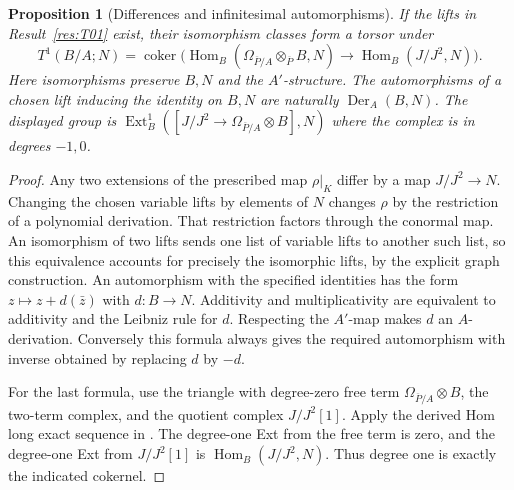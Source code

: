 \documentclass[11pt,oneside,openany]{book}
\newtheorem{proposition}[theorem]{Proposition}
\theoremstyle{definition}
\theoremstyle{remark}
\begin{document}
\begin{proposition}[Differences and infinitesimal automorphisms]\label{res:T02}
If the lifts in Result~\ref{res:T01} exist, their isomorphism
classes form a torsor under
\[
 T^1(B/A;N)=
 \operatorname{coker}\bigl(
  \operatorname{Hom}_B(\Omega_{\overline P/A}\otimes_{\overline P}B,N)
  \longrightarrow \operatorname{Hom}_B(J/J^2,N)\bigr).
\]
Here isomorphisms preserve \(B,N\) and the \(A'\)-structure.
The automorphisms of a chosen lift inducing the identity on
\(B,N\) are naturally \(\operatorname{Der}_A(B,N)\).
The displayed group is
\(\operatorname{Ext}^1_B([J/J^2\to\Omega_{\overline P/A}\otimes B],N)\)
where the complex is in degrees \(-1,0\).
\end{proposition}
\begin{proof}
Any two extensions of the prescribed map \(\rho|_K\) differ by a
map \(J/J^2\to N\). Changing the chosen variable lifts by elements
of \(N\) changes \(\rho\) by the restriction of a polynomial
derivation. That restriction factors through the conormal map.
An isomorphism of two lifts sends one list of variable lifts to
another such list, so this equivalence accounts for precisely the
isomorphic lifts, by the explicit graph construction.
An automorphism with the specified identities has the form
\(z\mapsto z+d(\bar z)\) with \(d:B\to N\). Additivity and
multiplicativity are equivalent to additivity and the Leibniz
rule for \(d\). Respecting the \(A'\)-map makes \(d\) an
\(A\)-derivation. Conversely this formula always gives the required
automorphism with inverse obtained by replacing \(d\) by \(-d\).

For the last formula, use the triangle with degree-zero free
term \(\Omega_{\overline P/A}\otimes B\), the two-term complex,
and the quotient complex \(J/J^2[1]\). Apply the derived Hom
long exact sequence in \cite[R11]{homological}. The degree-one
Ext from the free term is zero, and the degree-one Ext from
\(J/J^2[1]\) is \(\operatorname{Hom}_B(J/J^2,N)\).
Thus degree one is exactly the indicated cokernel.
\end{proof}
\end{document}
